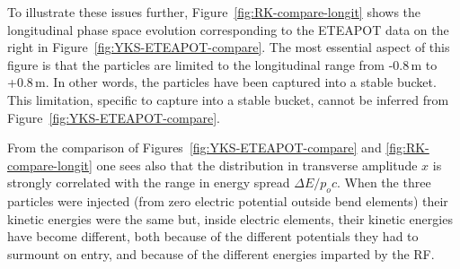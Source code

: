 \documentclass[12]{article}
\begin{document}
To illustrate these issues further, Figure~\ref{fig:RK-compare-longit}
shows the longitudinal phase space evolution corresponding 
to the ETEAPOT data on the right in 
Figure~\ref{fig:YKS-ETEAPOT-compare}. The most essential aspect of
this figure is that the particles are limited to the longitudinal
range from -0.8\,m to +0.8\,m. In other words, the particles have
been captured into a stable bucket. This limitation, specific to capture
into a stable bucket, cannot be inferred from 
Figure~\ref{fig:YKS-ETEAPOT-compare}. 

From the comparison of 
Figures~\ref{fig:YKS-ETEAPOT-compare} and \ref{fig:RK-compare-longit}
one sees also that the 
distribution in transverse amplitude $x$ is strongly correlated
with the range in energy spread $\Delta E/p_oc$. When the
three particles were injected (from zero electric potential outside
bend elements) their kinetic energies were the 
same but, inside electric elements, their kinetic energies have become
different, both because of the different potentials they had to
surmount on entry, and because of the different energies imparted 
by the RF.  
\end{document}
